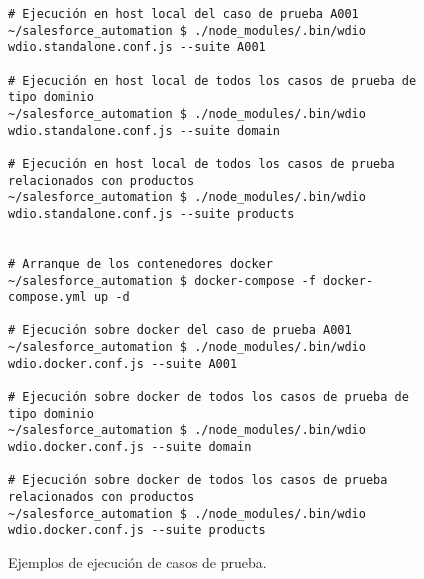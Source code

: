 \begin{figure}[H]
\footnotesize
\begin{verbatim}
# Ejecución en host local del caso de prueba A001
~/salesforce_automation $ ./node_modules/.bin/wdio wdio.standalone.conf.js --suite A001

# Ejecución en host local de todos los casos de prueba de tipo dominio
~/salesforce_automation $ ./node_modules/.bin/wdio wdio.standalone.conf.js --suite domain

# Ejecución en host local de todos los casos de prueba relacionados con productos
~/salesforce_automation $ ./node_modules/.bin/wdio wdio.standalone.conf.js --suite products


# Arranque de los contenedores docker
~/salesforce_automation $ docker-compose -f docker-compose.yml up -d

# Ejecución sobre docker del caso de prueba A001
~/salesforce_automation $ ./node_modules/.bin/wdio wdio.docker.conf.js --suite A001

# Ejecución sobre docker de todos los casos de prueba de tipo dominio
~/salesforce_automation $ ./node_modules/.bin/wdio wdio.docker.conf.js --suite domain

# Ejecución sobre docker de todos los casos de prueba relacionados con productos
~/salesforce_automation $ ./node_modules/.bin/wdio wdio.docker.conf.js --suite products

\end{verbatim}
\caption{Ejemplos de ejecución de casos de prueba.}
\label{execution}
\end{figure}

